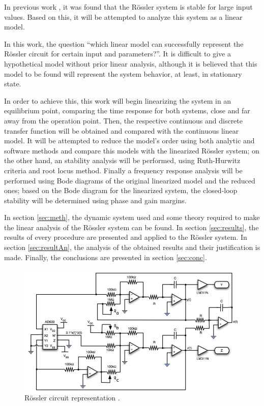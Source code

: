 In previous work \cite{JS_PL}, it was found that the Rössler system is stable for large input values. Based on this, it will be attempted to analyze this system as a linear model.

In this work, the question ``which linear model can successfully represent the Rössler circuit for certain input and parameters?''. It is difficult to give a hypothetical model without prior linear analysis, although it is believed that this model to be found will represent the system behavior, at least, in stationary state.

In order to achieve this, this work will begin linearizing the system in an equilibrium point, comparing the time response for both systems, close and far away from the operation point. Then, the respective continuous and discrete transfer function will be obtained and compared with the continuous linear model. It will be attempted to reduce the model's order using both analytic and software methods and compare this models with the linearized Rössler system; on the other hand, an stability analysis will be performed, using Ruth-Hurwitz criteria and root locus method. Finally a frequency response analysis will be performed using Bode diagrams of the original linearized model and the reduced ones; based on the Bode diagram for the linearized system, the closed-loop stability will be determined using phase and gain margins.

In section \ref{sec:meth}, the dynamic system used and some theory required to make the linear analysis of the Rössler system can be found. In section \ref{sec:results}, the results of every procedure are presented and applied to the Rössler system. In section \ref{sec:resultAn}, the analysis of the obtained results and their justification is made. Finally, the conclusions are presented in section \ref{sec:conc}.

\begin{figure}
    \centering
    \includegraphics[scale=0.325]{figs/Circuito.png}
    \caption{R\"ossler circuit representation \cite{canals2014random}.}
    \label{fig:circuito}
\end{figure}

